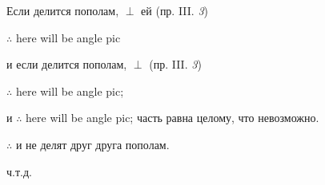 \documentclass[12pt, onecolumn]{article}
\begin{document}
\begin{multicols}{2}
        \begin{center}
            Если \AC делится пополам, \EF $\perp$ ей (пр. III. \emph{3})

            $\therefore$ here will be angle pic
            
            и если \BD делится пополам, \EF $\perp$ \BD (пр. III. \emph{3})

            $\therefore$ here will be angle pic;

            и $\therefore$ here will be angle pic;
            часть равна целому, что невозможно.

            $\therefore$ \AC и \BD не делят друг друга пополам.
        \end{center}
        \begin{flushright}ч.т.д.\end{flushright}
    \end{multicols}
\end{document}
